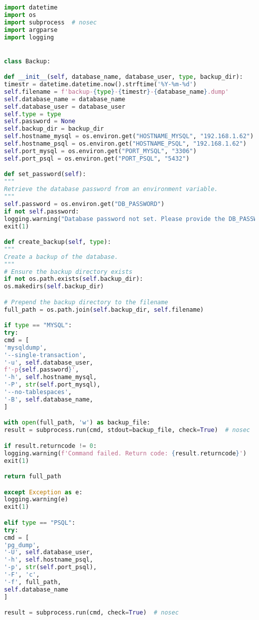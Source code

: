 \begin{lstlisting}[language=Python, caption={Python-script voor back-ups en retentiebeleid.}]
import datetime
import os
import subprocess  # nosec
import argparse
import logging


class Backup:

def __init__(self, database_name, database_user, type, backup_dir):
timestr = datetime.datetime.now().strftime('%Y-%m-%d')
self.filename = f'backup-{type}-{timestr}-{database_name}.dump'
self.database_name = database_name
self.database_user = database_user
self.type = type
self.password = None
self.backup_dir = backup_dir
self.hostname_mysql = os.environ.get("HOSTNAME_MYSQL", "192.168.1.62")
self.hostname_psql = os.environ.get("HOSTNAME_PSQL", "192.168.1.62")
self.port_mysql = os.environ.get("PORT_MYSQL", "3306")
self.port_psql = os.environ.get("PORT_PSQL", "5432")

def set_password(self):
"""
Retrieve the database password from an environment variable.
"""
self.password = os.environ.get("DB_PASSWORD")
if not self.password:
logging.warning("Database password not set. Please provide the DB_PASSWORD environment variable.")
exit(1)

def create_backup(self, type):
"""
Create a backup of the database.
"""
# Ensure the backup directory exists
if not os.path.exists(self.backup_dir):
os.makedirs(self.backup_dir)

# Prepend the backup directory to the filename
full_path = os.path.join(self.backup_dir, self.filename)

if type == "MYSQL":
try:
cmd = [
'mysqldump',
'--single-transaction',
'-u', self.database_user,
f'-p{self.password}',
'-h', self.hostname_mysql,
'-P', str(self.port_mysql),
'--no-tablespaces',
'-B', self.database_name,
]

with open(full_path, 'w') as backup_file:
result = subprocess.run(cmd, stdout=backup_file, check=True)  # nosec

if result.returncode != 0:
logging.warning(f'Command failed. Return code: {result.returncode}')
exit(1)

return full_path

except Exception as e:
logging.warning(e)
exit(1)

elif type == "PSQL":
try:
cmd = [
'pg_dump',
'-U', self.database_user,
'-h', self.hostname_psql,
'-p', str(self.port_psql),
'-F', 'c',
'-f', full_path,
self.database_name
]

result = subprocess.run(cmd, check=True)  # nosec


\end{lstlisting}
